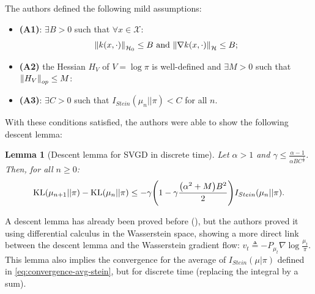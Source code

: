 \documentclass{article}
\newcommand{\X}{\mathcal{X}}
\newcommand{\KL}{\mathrm{KL}}
\renewcommand{\H}{\mathcal{H}}
\newcommand{\Stein}{I_{Stein}(\mu | \pi)}
\DeclarePairedDelimiter{\norm}{\|}{\|}
\DeclarePairedDelimiter{\pare}{(}{)}
\newtheorem{lemma}{Lemma}
\begin{document}
The authors defined the following mild assumptions:
\begin{itemize}
  \item {\bf (A1)}: $\exists B > 0$ such that $\forall x \in \X$:
    $$
    \norm*{k(x, \cdot)}_{\H_0} \leq B \text{ and } \norm*{\nabla k(x, \cdot)}_{\H} \leq B;
    $$
  \item {\bf (A2)} the Hessian $H_V$ of $V = \log \pi$ is well-defined and
    $\exists M > 0$ such that $\norm*{H_V}_{op} \leq M$:
  \item {\bf (A3)}: $\exists C > 0$ such that $I_{Stein}(\mu_n || \pi) < C$ for all $n$.
\end{itemize}
With these conditions satisfied, the authors were able to show the following descent
lemma:
\begin{lemma}[Descent lemma  for SVGD in discrete time]
  Let $\alpha > 1$ and $\gamma \leq \frac{\alpha-1}{\alpha B C^{\frac{1}{2}}}$.
  Then, for all $n \geq 0$:
  $$
  \KL(\mu_{n+1} || \pi) - \KL(\mu_n || \pi) \leq - \gamma \pare*{1 - \gamma
  \frac{\pare*{ \alpha^2 + M} B^2 }{2}} I_{Stein}(\mu_n || \pi).
  $$
\end{lemma}
A descent lemma has already been proved before (\cite{SVGD-flow}),
but the authors proved it using differential calculus in the Wasserstein space,
showing a more direct link between the descent lemma and the 
Wasserstein gradient flow: $v_t \triangleq -P_{\mu_t} \nabla \log \frac{\mu_t}{\pi}$.
This lemma also implies the convergence for the average of $\Stein$
defined in \eqref{eq:convergence-avg-stein}, but for discrete time (replacing the
integral by a sum).
\end{document}
